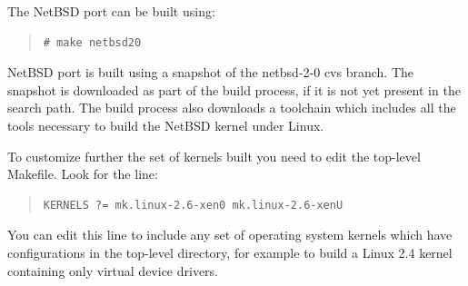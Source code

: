 \documentclass[11pt,twoside,final,openright]{report}
\begin{document}
The NetBSD port can be built using: 
\begin{quote}
\begin{verbatim}
# make netbsd20
\end{verbatim} 
\end{quote} 
NetBSD port is built using a snapshot of the netbsd-2-0 cvs branch.
The snapshot is downloaded as part of the build process, if it is not
yet present in the  search path.  The build
process also downloads a toolchain which includes all the tools
necessary to build the NetBSD kernel under Linux.

To customize further the set of kernels built you need to edit
the top-level Makefile. Look for the line: 

\begin{quote}
\begin{verbatim}
KERNELS ?= mk.linux-2.6-xen0 mk.linux-2.6-xenU
\end{verbatim} 
\end{quote} 

You can edit this line to include any set of operating system kernels
which have configurations in the top-level 
directory, for example  to build a Linux 2.4
kernel containing only virtual device drivers.




\end{document}
